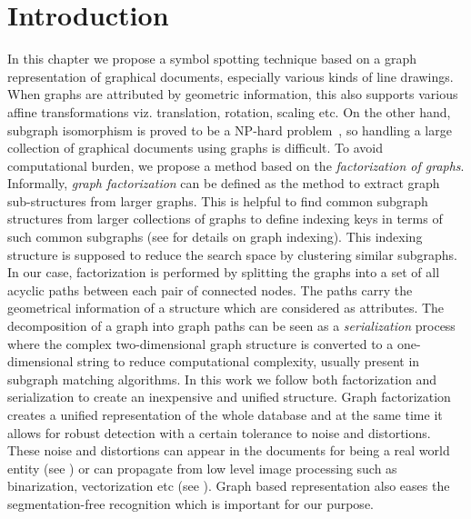 \section{Introduction}
\label{sec:hssg:intro}
In this chapter we propose a symbol spotting technique based on a graph representation of graphical documents, especially various kinds of line drawings. When graphs are attributed by geometric information, this also supports various affine transformations viz. translation, rotation, scaling etc. On the other hand, subgraph isomorphism is proved to be a NP-hard problem~\cite{Mehlhorn1984}, so handling a large collection of graphical documents using graphs is difficult. To avoid computational burden, we propose a method based on the \emph{factorization of graphs}. Informally, \emph{graph factorization} can be defined as the method to extract graph sub-structures from larger graphs. This is helpful to find common subgraph structures from larger collections of graphs to define indexing keys in terms of such common subgraphs (see  for details on graph indexing). This indexing structure is supposed to reduce the search space by clustering similar subgraphs. In our case, factorization is performed by splitting the graphs into a set of all acyclic paths between each pair of connected nodes. The paths carry the geometrical information of a structure which are considered as attributes. The decomposition of a graph into graph paths can be seen as a \emph{serialization} process where the complex two-dimensional graph structure is converted to a one-dimensional string to reduce computational complexity, usually present in subgraph matching algorithms. In this work we follow both factorization and serialization to create an inexpensive and unified structure. Graph factorization creates a unified representation of the whole database and at the same time it allows for robust detection with a certain tolerance to noise and distortions. These noise and distortions can appear in the documents for being a real world entity (see ) or can propagate from low level image processing such as binarization, vectorization etc (see ). Graph based representation also eases the segmentation-free recognition which is important for our purpose.

